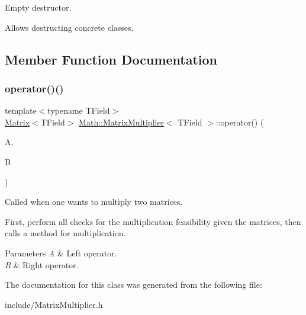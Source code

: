 Empty destructor. 

Allows destructing concrete classes. 

\subsection{Member Function Documentation}
\mbox{\label{classMath_1_1MatrixMultiplier_a880732c9b332798ef46e5d90f9b70625}} 
\subsubsection{\texorpdfstring{operator()()}{operator()()}}
{\footnotesize\ttfamily template$<$typename T\+Field$>$ \\
\mbox{\hyperlink{classMath_1_1Matrix}{Matrix}}$<$T\+Field$>$ \mbox{\hyperlink{classMath_1_1MatrixMultiplier}{Math\+::\+Matrix\+Multiplier}}$<$ T\+Field $>$\+::operator() (\begin{DoxyParamCaption}\item[{const \mbox{\hyperlink{classMath_1_1Matrix}{Matrix}}$<$ T\+Field $>$ \&}]{A,  }\item[{const \mbox{\hyperlink{classMath_1_1Matrix}{Matrix}}$<$ T\+Field $>$ \&}]{B }\end{DoxyParamCaption})\hspace{0.3cm}{\ttfamily [inline]}}



Called when one wants to multiply two matrices. 

First, perform all checks for the multiplication feasibility given the matrices, then calls a method for multiplication.


\begin{DoxyParams}{Parameters}
{\em A} & Left operator. \\
\hline
{\em B} & Right operator. \\
\hline
\end{DoxyParams}


The documentation for this class was generated from the following file\+:\begin{DoxyCompactItemize}
\item 
include/Matrix\+Multiplier.\+h\end{DoxyCompactItemize}
